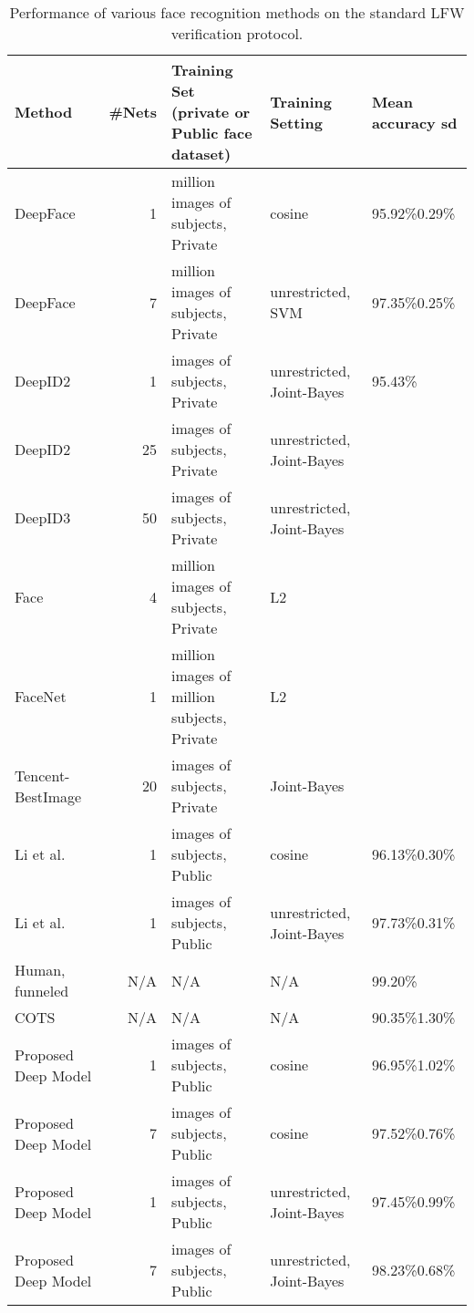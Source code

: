 \documentclass[10pt,journal,compsoc]{IEEEtran}
\newcommand{\etal}{et al.}
\begin{document}
\begin{table*}[htbp]
\centering
\caption{Performance of various face recognition methods on the standard LFW verification protocol.}\label{tab:lfw_standard}
\begin{tabular}{l|rlll}
\toprule
Method                      & \#Nets & Training Set (private or Public face dataset) & Training Setting & Mean accuracy  sd \\ \midrule
DeepFace~\cite{dl:deepface} & 1 &  million images of  subjects, Private & cosine & 95.92\%0.29\%\\
DeepFace  & 7 &  million images of  subjects, Private    & unrestricted, SVM    & 97.35\%0.25\% \\
DeepID2~\cite{dl:deepID2} & 1 &  images of  subjects, Private & unrestricted, Joint-Bayes & 95.43\% \\
DeepID2 & 25    &  images of  subjects, Private    & unrestricted, Joint-Bayes &  \\
DeepID3~\cite{dl:deepID3} & 50 &  images of  subjects, Private & unrestricted, Joint-Bayes &  \\
Face~\cite{dl:face++} & 4  &  million images of  subjects, Private & L2 & \\
FaceNet~\cite{dl:facenet} & 1  &  million images of  million subjects, Private & L2 &  \\
Tencent-BestImage~\cite{dl:tencent}  & 20 &  images of  subjects, Private & Joint-Bayes &  \\
Li \etal~\cite{DB:CASIA} & 1  &  images of  subjects, Public & cosine & 96.13\%0.30\%\\
Li \etal   & 1  &  images of  subjects, Public &unrestricted, Joint-Bayes & 97.73\%0.31\% \\
Human, funneled                 & N/A & N/A   & N/A & 99.20\%\\
COTS                    & N/A   & N/A   & N/A & 90.35\%1.30\%\\
\hline
Proposed Deep Model & 1  &  images of  subjects, Public & cosine & 96.95\%1.02\% \\
Proposed Deep Model & 7  &  images of  subjects, Public & cosine & 97.52\%0.76\% \\
Proposed Deep Model & 1  &  images of  subjects, Public & unrestricted, Joint-Bayes & 97.45\%0.99\%  \\
Proposed Deep Model & 7  &  images of  subjects, Public & unrestricted, Joint-Bayes & 98.23\%0.68\% \\
\bottomrule
\end{tabular}
\end{table*}
\end{document}
